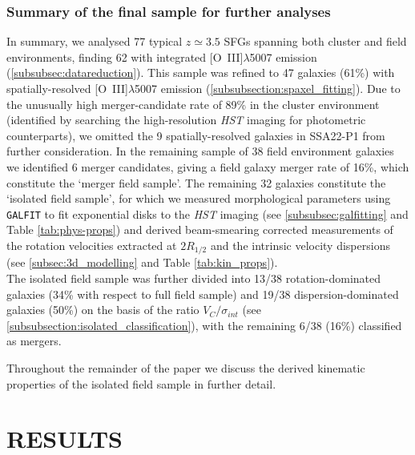 \documentclass[fleqn,usenatbib]{mnras}
\begin{document}
\subsubsection{Summary of the final sample for further analyses}\label{subsubsec:kin_sample_summary}
In summary, we analysed 77 typical $z\simeq3.5$ SFGs spanning both cluster and field environments, finding 62 with integrated [O~{\sc III}]$\lambda$5007 emission (\cref{subsubsec:datareduction}).
This sample was refined to 47 galaxies (61\%) with spatially-resolved [O~{\sc III}]$\lambda$5007 emission (\cref{subsubsection:spaxel_fitting}).
Due to the unusually high merger-candidate rate of 89\% in the cluster environment (identified by searching the high-resolution {\em HST} imaging for photometric counterparts), we omitted the 9 spatially-resolved galaxies in SSA22-P1 from further consideration.
In the remaining sample of 38 field environment galaxies we identified 6 merger candidates, giving a field galaxy merger rate of 16\%, which constitute the `merger field sample'.
The remaining 32 galaxies constitute the `isolated field sample', for which we measured morphological parameters using {\tt GALFIT} to fit exponential disks to the {\em HST} imaging (see \cref{subsubsec:galfitting} and Table \ref{tab:phys-props}) and derived beam-smearing corrected measurements of the rotation velocities extracted at $2R_{1/2}$ and the intrinsic velocity dispersions (see \cref{subsec:3d_modelling} and Table \ref{tab:kin_props}). \\

\noindent
The isolated field sample was further divided into 13/38 rotation-dominated galaxies (34\% with respect to full field sample) and 19/38 dispersion-dominated galaxies (50\%) on the basis of the ratio $V_{C}/\sigma_{int}$ (see \cref{subsubsection:isolated_classification}), with the remaining 6/38 (16\%) classified as mergers.

Throughout the remainder of the paper we discuss the derived kinematic properties of the isolated field sample in further detail.

\section{RESULTS}\label{sec:results}
\end{document}
